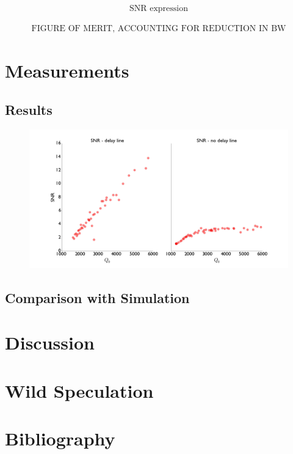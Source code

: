 \documentclass[11pt]{amsart}
\begin{document}
\begin{align}
\text{SNR expression}
\end{align}

\begin{align}
\text{FIGURE OF MERIT, ACCOUNTING FOR REDUCTION IN BW}
\end{align}

\section{Measurements}

\subsection{Results}

\begin{figure}[htbp]
\centering
\includegraphics[width=\textwidth]{summary_plots}
\caption{}
\label{fig:summary_plots}
\end{figure}

\subsection{Comparison with Simulation}

\section{Discussion}

\section{Wild Speculation}

\section{Bibliography}
\end{document}
